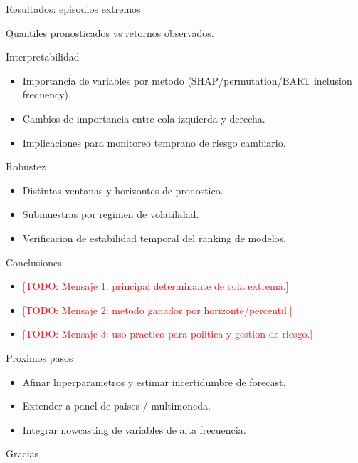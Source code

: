 ﻿\documentclass[aspectratio=169,10pt]{beamer}
\newcommand{\todo}[1]{\textcolor{red}{[TODO: #1]}}
\begin{document}
\begin{frame}{Resultados: episodios extremos}
\centering
{}

\vspace{0.3cm}
\small Quantiles pronosticados vs retornos observados.
\end{frame}

\begin{frame}{Interpretabilidad}
\begin{itemize}
    \item Importancia de variables por metodo (SHAP/permutation/BART inclusion frequency).
    \item Cambios de importancia entre cola izquierda y derecha.
    \item Implicaciones para monitoreo temprano de riesgo cambiario.
\end{itemize}
\end{frame}

\begin{frame}{Robustez}
\begin{itemize}
    \item Distintas ventanas y horizontes de pronostico.
    \item Submuestras por regimen de volatilidad.
    \item Verificacion de estabilidad temporal del ranking de modelos.
\end{itemize}
\end{frame}

\begin{frame}{Conclusiones}
\begin{itemize}
    \item \todo{Mensaje 1: principal determinante de cola extrema.}
    \item \todo{Mensaje 2: metodo ganador por horizonte/percentil.}
    \item \todo{Mensaje 3: uso practico para politica y gestion de riesgo.}
\end{itemize}
\end{frame}

\begin{frame}{Proximos pasos}
\begin{itemize}
    \item Afinar hiperparametros y estimar incertidumbre de forecast.
    \item Extender a panel de paises / multimoneda.
    \item Integrar nowcasting de variables de alta frecuencia.
\end{itemize}
\end{frame}

\begin{frame}
\centering
\Large Gracias
\end{frame}
\end{document}
